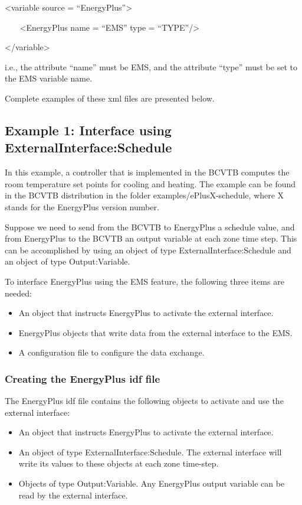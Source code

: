 \textless{}variable source = ``EnergyPlus''\textgreater{}

~~~ \textless{}EnergyPlus name = ``EMS'' type = ``TYPE''/\textgreater{}

\textless{}/variable\textgreater{}

i.e., the attribute ``name'' must be EMS, and the attribute ``type'' must be set to the EMS variable name.

Complete examples of these xml files are presented below.

\subsection{Example 1: Interface using ExternalInterface:Schedule}\label{example-1-interface-using-externalinterfaceschedule}

In this example, a controller that is implemented in the BCVTB computes the room temperature set points for cooling and heating. The example can be found in the BCVTB distribution in the folder examples/ePlusX-schedule, where X stands for the EnergyPlus version number.

Suppose we need to send from the BCVTB to EnergyPlus a schedule value, and from EnergyPlus to the BCVTB an output variable at each zone time step. This can be accomplished by using an object of type ExternalInterface:Schedule and an object of type Output:Variable.

To interface EnergyPlus using the EMS feature, the following three items are needed:

\begin{itemize}
\item
  An object that instructs EnergyPlus to activate the external interface.
\item
  EnergyPlus objects that write data from the external interface to the EMS.
\item
  A configuration file to configure the data exchange.
\end{itemize}

\subsubsection{Creating the EnergyPlus idf file}\label{creating-the-energyplus-idf-file}

The EnergyPlus idf file contains the following objects to activate and use the external interface:

\begin{itemize}
\item
  An object that instructs EnergyPlus to activate the external interface.
\item
  An object of type ExternalInterface:Schedule. The external interface will write its values to these objects at each zone time-step.
\item
  Objects of type Output:Variable. Any EnergyPlus output variable can be read by the external interface.
\end{itemize}

